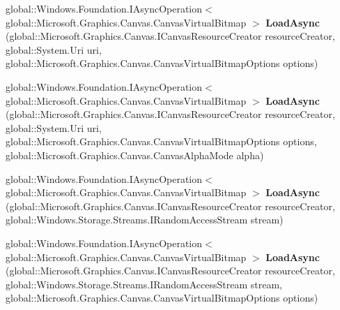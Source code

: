 \begin{DoxyCompactItemize}
global\+::\+Windows.\+Foundation.\+I\+Async\+Operation$<$ global\+::\+Microsoft.\+Graphics.\+Canvas.\+Canvas\+Virtual\+Bitmap $>$ {\bfseries Load\+Async} (global\+::\+Microsoft.\+Graphics.\+Canvas.\+I\+Canvas\+Resource\+Creator resource\+Creator, global\+::\+System.\+Uri uri, global\+::\+Microsoft.\+Graphics.\+Canvas.\+Canvas\+Virtual\+Bitmap\+Options options)
\item 
\mbox{\label{interface_microsoft_1_1_graphics_1_1_canvas_1_1_i_canvas_virtual_bitmap_statics_ac1747ce10fe0cd80d92ea79b088c0fa3}} 
global\+::\+Windows.\+Foundation.\+I\+Async\+Operation$<$ global\+::\+Microsoft.\+Graphics.\+Canvas.\+Canvas\+Virtual\+Bitmap $>$ {\bfseries Load\+Async} (global\+::\+Microsoft.\+Graphics.\+Canvas.\+I\+Canvas\+Resource\+Creator resource\+Creator, global\+::\+System.\+Uri uri, global\+::\+Microsoft.\+Graphics.\+Canvas.\+Canvas\+Virtual\+Bitmap\+Options options, global\+::\+Microsoft.\+Graphics.\+Canvas.\+Canvas\+Alpha\+Mode alpha)
\item 
\mbox{\label{interface_microsoft_1_1_graphics_1_1_canvas_1_1_i_canvas_virtual_bitmap_statics_aee81585da1cf32d9da0d24e264902778}} 
global\+::\+Windows.\+Foundation.\+I\+Async\+Operation$<$ global\+::\+Microsoft.\+Graphics.\+Canvas.\+Canvas\+Virtual\+Bitmap $>$ {\bfseries Load\+Async} (global\+::\+Microsoft.\+Graphics.\+Canvas.\+I\+Canvas\+Resource\+Creator resource\+Creator, global\+::\+Windows.\+Storage.\+Streams.\+I\+Random\+Access\+Stream stream)
\item 
\mbox{\label{interface_microsoft_1_1_graphics_1_1_canvas_1_1_i_canvas_virtual_bitmap_statics_afcb7bb816ebb415ed059fda157c6bdca}} 
global\+::\+Windows.\+Foundation.\+I\+Async\+Operation$<$ global\+::\+Microsoft.\+Graphics.\+Canvas.\+Canvas\+Virtual\+Bitmap $>$ {\bfseries Load\+Async} (global\+::\+Microsoft.\+Graphics.\+Canvas.\+I\+Canvas\+Resource\+Creator resource\+Creator, global\+::\+Windows.\+Storage.\+Streams.\+I\+Random\+Access\+Stream stream, global\+::\+Microsoft.\+Graphics.\+Canvas.\+Canvas\+Virtual\+Bitmap\+Options options)
\item 
\mbox{\label{interface_microsoft_1_1_graphics_1_1_canvas_1_1_i_canvas_virtual_bitmap_statics_a60b2049c357c42be3e7dbccef1e43260}} 

\end{DoxyCompactItemize}
